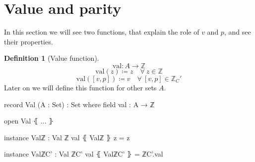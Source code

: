 \documentclass[a4paper]{report}
\theoremstyle{definition}
\newtheorem{definition}{Definition}
\theoremstyle{lemma}
\theoremstyle{theorem}
\newcommand\bZ{\mathbb{Z}}
\begin{document}
\section{Value and parity}
In this section we will see two functions, that explain the role of $v$ and $p$,
and see their properties.

\begin{definition}[Value function]
  \[\mathrm{val} \colon A \to \bZ\]
  \[\mathrm{val}(z) \coloneqq z \quad\forall\ z\in\bZ\]
  \[\mathrm{val}([v,p]) \coloneqq v \quad\forall\ [v,p]\in\bZ_C'\]
  Later on we will define this function for other sets $A$.

  \begin{code}
record Val (A : Set) : Set where
  field
    val : A → ℤ

open Val ⦃ ... ⦄

instance
  Valℤ : Val ℤ
  val ⦃ Valℤ ⦄ z = z

instance
  ValℤC' : Val ℤC'
  val ⦃ ValℤC' ⦄ = ℤC'.val
  \end{code}
\end{definition}
\end{document}
